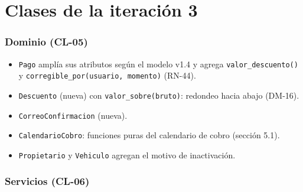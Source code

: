 \section{Clases de la iteración 3}


\subsubsection{Dominio (CL-05)}


\begin{itemize}
  \item \texttt{Pago} amplía sus atributos según el modelo v1.4 y agrega \texttt{valor\_descuento()} y \texttt{corregible\_por(usuario, momento)} (RN-44).
  \item \texttt{Descuento} (nueva) con \texttt{valor\_sobre(bruto)}: redondeo hacia abajo (DM-16).
  \item \texttt{CorreoConfirmacion} (nueva).
  \item \texttt{CalendarioCobro}: funciones puras del calendario de cobro (sección 5.1).
  \item \texttt{Propietario} y \texttt{Vehiculo} agregan el motivo de inactivación.
\end{itemize}

\subsubsection{Servicios (CL-06)}


